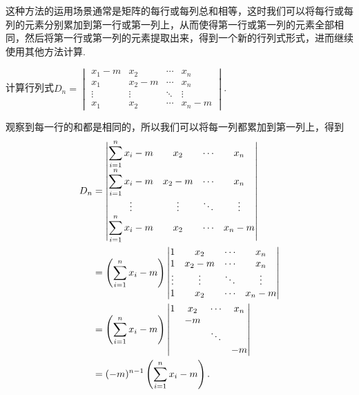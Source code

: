 这种方法的运用场景通常是矩阵的每行或每列总和相等，这时我们可以将每行或每列的元素分别累加到第一行或第一列上，从而使得第一行或第一列的元素全部相同，然后将第一行或第一列的元素提取出来，得到一个新的行列式形式，进而继续使用其他方法计算.

\begin{example}{}{}
    计算行列式$D_n=\begin{vmatrix}
            x_1-m  & x_2    & \cdots & x_n    \\
            x_1    & x_2-m  & \cdots & x_n    \\
            \vdots & \vdots & \ddots & \vdots \\
            x_1    & x_2    & \cdots & x_n-m
        \end{vmatrix}$.
\end{example}

\begin{solution}
    观察到每一行的和都是相同的，所以我们可以将每一列都累加到第一列上，得到
    \begin{align*}
        D_n & =\begin{vmatrix}
                   \displaystyle\sum_{i=1}^{n}\limits x_i-m & x_2    & \cdots & x_n    \\
                   \displaystyle\sum_{i=1}^{n}\limits x_i-m & x_2-m  & \cdots & x_n    \\
                   \vdots                            & \vdots & \ddots & \vdots \\
                   \displaystyle\sum_{i=1}^{n}\limits x_i-m & x_2    & \cdots & x_n-m
               \end{vmatrix} \\
            & =\left(\sum_{i=1}^{n}\limits x_i-m\right)
        \begin{vmatrix}
            1      & x_2    & \cdots & x_n    \\
            1      & x_2-m  & \cdots & x_n    \\
            \vdots & \vdots & \ddots & \vdots \\
            1      & x_2    & \cdots & x_n-m
        \end{vmatrix}                                   \\
            & =\left(\sum_{i=1}^{n}\limits x_i-m\right)
        \begin{vmatrix}
            1 & x_2 & \cdots & x_n \\
              & -m  &        &     \\
              &     & \ddots &     \\
              &     &        & -m
        \end{vmatrix}                                              \\
            & =(-m)^{n-1}\left(\sum_{i=1}^{n}\limits x_i-m\right).
    \end{align*}
\end{solution}

